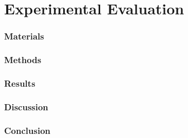 \documentclass[12pt]{article}
\begin{document}
\clearpage
\part{Experimental Evaluation}
\section{Materials}\label{ch:materials}


\section{Methods}\label{ch:methods}


\section{Results}\label{ch:results}


\section{Discussion}\label{ch:discussion}


\section{Conclusion}\label{ch:conclusion}


\clearpage
\printbibliography

\clearpage


\clearpage

\end{document}
